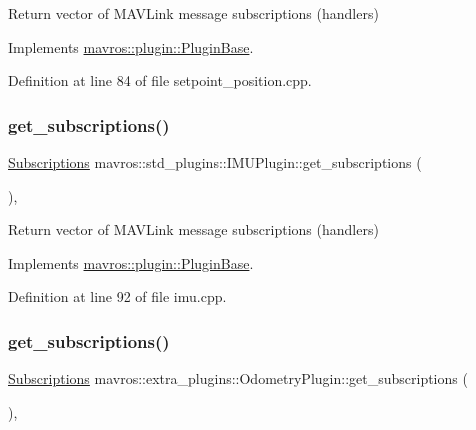 Return vector of M\+A\+V\+Link message subscriptions (handlers) 



Implements \mbox{\hyperlink{group__plugin_gaf4e23fec6d7436a62cbf0942a2e5791c}{mavros\+::plugin\+::\+Plugin\+Base}}.



Definition at line 84 of file setpoint\+\_\+position.\+cpp.

\mbox{\label{group__plugin_ga380625ad9d721e273b204b1b74724e40}} 
\subsubsection{\texorpdfstring{get\_subscriptions()}{get\_subscriptions()}\hspace{0.1cm}{\footnotesize\ttfamily [31/41]}}
{\footnotesize\ttfamily \mbox{\hyperlink{group__plugin_ga8967d61fc77040e0c3ea5a4585d62a09}{Subscriptions}} mavros\+::std\+\_\+plugins\+::\+I\+M\+U\+Plugin\+::get\+\_\+subscriptions (\begin{DoxyParamCaption}{ }\end{DoxyParamCaption})\hspace{0.3cm}{\ttfamily [inline]}, {\ttfamily [virtual]}}



Return vector of M\+A\+V\+Link message subscriptions (handlers) 



Implements \mbox{\hyperlink{group__plugin_gaf4e23fec6d7436a62cbf0942a2e5791c}{mavros\+::plugin\+::\+Plugin\+Base}}.



Definition at line 92 of file imu.\+cpp.

\mbox{\label{group__plugin_ga67f0c200b8288b38f454aadd9ea68710}} 
\subsubsection{\texorpdfstring{get\_subscriptions()}{get\_subscriptions()}\hspace{0.1cm}{\footnotesize\ttfamily [32/41]}}
{\footnotesize\ttfamily \mbox{\hyperlink{group__plugin_ga8967d61fc77040e0c3ea5a4585d62a09}{Subscriptions}} mavros\+::extra\+\_\+plugins\+::\+Odometry\+Plugin\+::get\+\_\+subscriptions (\begin{DoxyParamCaption}{ }\end{DoxyParamCaption})\hspace{0.3cm}{\ttfamily [inline]}, {\ttfamily [virtual]}}



